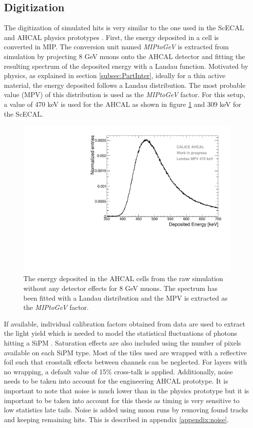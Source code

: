 \subsection{Digitization}

The digitization of simulated hits is very similar to the one used in the ScECAL and AHCAL physics prototypes \cite{2011_JINST_6_P04003}. First, the energy deposited in a cell is converted in MIP. The conversion unit named \textit{MIPtoGeV} is extracted from simulation by projecting 8 GeV muons onto the AHCAL detector and fitting the resulting spectrum of the deposited energy with a Landau function. Motivated by physics, as explained in section \ref{subsec:PartInter}, ideally for a thin active material, the energy deposited follows a Landau distribution. The most probable value (MPV) of this distribution is used as the \textit{MIPtoGeV} factor. For this setup, a value of 470 keV is used for the AHCAL as shown in figure \ref{fig:landau_MPV} and 309 keV for the ScECAL.

\begin{figure}[htbp!]
  \centering
  \includegraphics[width=0.5\linewidth]{chap4/fig/Landau_mu_HCAL.pdf}
  \caption{The energy deposited in the AHCAL cells from the raw simulation without any detector effects for 8 GeV muons. The spectrum has been fitted with a Landau distribution and the MPV is extracted as the \textit{MIPtoGeV} factor.} \label{fig:landau_MPV}
\end{figure}

If available, individual calibration factors obtained from data are used to extract the light yield which is needed to model the statistical fluctuations of photons hitting a SiPM \cite{Hartbrich:2016bbz}. Saturation effects are also included using the number of pixels available on each SiPM type. Most of the tiles used are wrapped with a reflective foil such that crosstalk effects between channels can be neglected. For layers with no wrapping, a default value of 15\% cross-talk is applied. Additionally, noise needs to be taken into account for the engineering AHCAL prototype. It is important to note that noise is much lower than in the physics prototype but it is important to be taken into account for this thesis as timing is very sensitive to low statistics late tails. Noise is added using muon runs by removing found tracks and keeping remaining hits. This is described in appendix \ref{appendix:noise}.

